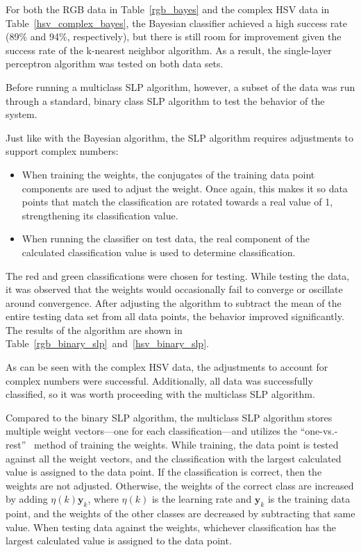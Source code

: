 \documentclass[twoside]{IEEEtran}
\begin{document}
For both the RGB data in Table~\ref{rgb_bayes} and the complex HSV data in Table~\ref{hsv_complex_bayes}, the Bayesian
classifier achieved a high success rate (89\% and 94\%, respectively), but there is still room for
improvement given the success rate of the k-nearest neighbor algorithm. As a result, the single-layer
perceptron algorithm was tested on both data sets.

Before running a multiclass SLP algorithm, however, a subset of the data was run through a standard, binary class SLP algorithm to test the behavior of
the system.

Just like with the Bayesian algorithm, the SLP algorithm requires adjustments to support
complex numbers:

\begin{itemize}
    \item When training the weights, the conjugates of the training data point components are used
          to adjust the weight. Once again, this makes it so data points that match the classification
          are rotated towards a real value of 1, strengthening its classification value.

    \item When running the classifier on test data, the real component of the calculated
          classification value is used to determine classification.
\end{itemize}

The red and green classifications were chosen for testing. While testing the data, it was observed
that the weights would occasionally fail to converge or oscillate around convergence. After
adjusting the algorithm to subtract the mean of the entire testing data set from all data points, the
behavior improved significantly. The results of the algorithm are shown in Table~\ref{rgb_binary_slp}~and~\ref{hsv_binary_slp}.

As can be seen with the complex HSV data, the adjustments to account for complex numbers
were successful. Additionally, all data was successfully classified, so it was worth proceeding with
the multiclass SLP algorithm.

Compared to the binary SLP algorithm, the multiclass SLP algorithm stores multiple weight vectors---one
for each classification---and utilizes the ``one-vs.-rest''~\cite{bishop} method of training the
weights. While training, the data point is tested against all the weight vectors, and the
classification with the largest calculated value is assigned to the data point. If the classification is
correct, then the weights are not adjusted. Otherwise, the weights of the correct class are
increased by adding \( \eta\left(k\right)\mathbf{y}_k \), where \( \eta\left(k\right) \) is the learning
rate and \( \mathbf{y}_k \) is the training data point, and the weights of the other classes are decreased
by subtracting that same value. When testing data against the weights, whichever classification has the
largest calculated value is assigned to the data point.
\end{document}
